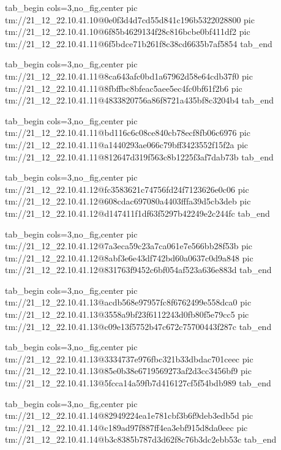  
 
 
 
 

\qqSecCmtScr


\ifcmt
  tab_begin cols=3,no_fig,center
    pic tm://21_12_22.10.41.10@0e0f3d4d7cd55d841c196b5322028800
    pic tm://21_12_22.10.41.10@6f85b4629134f28c816bcbe0bf411df2
    pic tm://21_12_22.10.41.11@6f5bdce71b261f8c38cd6635b7af5854
  tab_end
\fi


\ifcmt
  tab_begin cols=3,no_fig,center
    pic tm://21_12_22.10.41.11@8ca643afc0bd1a67962d58e64cdb37f0
    pic tm://21_12_22.10.41.11@8fbffbc8bfeac5aee5ec4fc0bf61f2b6
    pic tm://21_12_22.10.41.11@4833820756a86f8721a435bf8c3204b4
  tab_end
\fi


\ifcmt
  tab_begin cols=3,no_fig,center
    pic tm://21_12_22.10.41.11@bd116c6c08ce840cb78ecf8fb06c6976
    pic tm://21_12_22.10.41.11@a1440293ae066c79bff3423552f15f2a
    pic tm://21_12_22.10.41.11@812647d319f563c8b1225f3af7dab73b
  tab_end
\fi


\ifcmt
  tab_begin cols=3,no_fig,center
    pic tm://21_12_22.10.41.12@fc3583621c74756fd24f7123626e0c06
    pic tm://21_12_22.10.41.12@608cdac697080a4403fffa39d5cb3deb
    pic tm://21_12_22.10.41.12@d147411f1df63f5297b42249e2c244fc
  tab_end
\fi


\ifcmt
  tab_begin cols=3,no_fig,center
    pic tm://21_12_22.10.41.12@7a3eca59c23a7ca061e7e566bb28f53b
    pic tm://21_12_22.10.41.12@8abf3e6e43df742bd60a0637c0d9a848
    pic tm://21_12_22.10.41.12@831763f9452c6bf054af523a636e883d
  tab_end
\fi


\ifcmt
  tab_begin cols=3,no_fig,center
    pic tm://21_12_22.10.41.13@acdb568e97957fc8f6762499e558dca0
    pic tm://21_12_22.10.41.13@3558a9bf23f6112243d0fb80f5e79cc5
    pic tm://21_12_22.10.41.13@c09e13f5752b47c672c75700443f287c
  tab_end
\fi


\ifcmt
  tab_begin cols=3,no_fig,center
    pic tm://21_12_22.10.41.13@3334737e976fbc321b33dbdac701ceec
    pic tm://21_12_22.10.41.13@85e0b38e6719569273af2d3cc3456bf9
    pic tm://21_12_22.10.41.13@5fcca14a59fb7d416127cf5f54bdb989
  tab_end
\fi


\ifcmt
  tab_begin cols=3,no_fig,center
    pic tm://21_12_22.10.41.14@82949224ea1e781cbf3b6f9deb3edb5d
    pic tm://21_12_22.10.41.14@c189ad97f887ff4ea3ebf915d8da0eec
    pic tm://21_12_22.10.41.14@b3c8385b787d3d62f8c76b3dc2ebb53c
  tab_end
\fi


